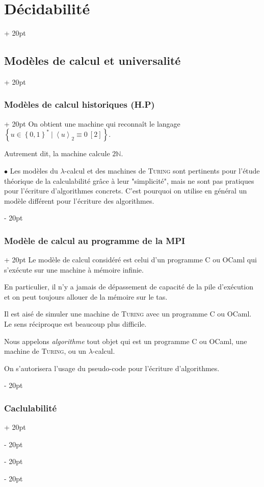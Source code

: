 \documentclass[a4paper, 12pt, twoside]{article}
\newcommand{\N}{\mathbb{N}} %
\newcommand{\set}[1]{\left\{ #1 \right\}}
\newcommand{\lrangle}[1]{\left\langle #1 \right\rangle}
\newcommand{\ind}[1][20pt]{\advance\leftskip + #1}
\newcommand{\deind}[1][20pt]{\advance\leftskip - #1}
\newenvironment{indt}[2][20pt]{#2 \par \ind[#1]}{\par \deind} %
\begin{document}
\begin{indt}{\section{Décidabilité}}
\begin{indt}{\subsection{Modèles de calcul et universalité}}
\begin{indt}{\subsubsection{Modèles de calcul historiques (H.P)}}
                 On obtient une machine qui reconnaît le langage $\set{u \in \set{0, 1}^*\ |\ \lrangle u _2 \equiv 0\ [2]}$.

                 Autrement dit, la machine calcule $2\N$.

                 \vspace{12pt}
                 
                 $\bullet$ Les modèles du $\lambda$-calcul et des machines de \textsc{Turing} sont pertinents pour l'étude théorique de la calculabilité grâce à leur "simplicité", mais ne sont pas pratiques pour l'écriture d'algorithmes concrets. C'est pourquoi on utilise en général un modèle différent pour l'écriture des algorithmes.
            \end{indt}

            \vspace{12pt}
            
            \begin{indt}{\subsubsection{Modèle de calcul au programme de la MPI}}
                Le modèle de calcul considéré est celui d'un programme C ou OCaml qui s'exécute sur une machine à mémoire infinie.

                En particulier, il n'y a jamais de dépassement de capacité de la pile d'exécution et on peut toujours allouer de la mémoire sur le tas.

                Il est aisé de simuler une machine de \textsc{Turing} avec un programme C ou OCaml.
                Le sens réciproque est beaucoup plus difficile.

                Nous appelons \emph{algorithme} tout objet qui est un programme C ou OCaml, une machine de \textsc{Turing}, ou un $\lambda$-calcul.

                On s'autorisera l'usage du pseudo-code pour l'écriture d'algorithmes.
            \end{indt}

            \vspace{12pt}
            
            \begin{indt}{\subsubsection{Caclulabilité}}
                \label{1.1.4}


\end{indt}
\end{indt}
\end{indt}
\end{document}
